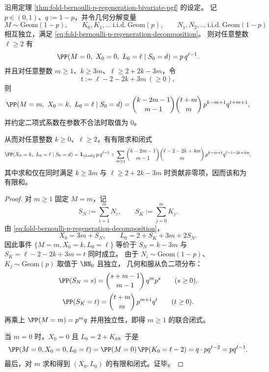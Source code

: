 \begin{theorem}\label{thm:fold-bernoulli-p-regeneration-triple-joint-law}
沿用定理 \ref{thm:fold-bernoulli-p-regeneration-bivariate-pgf} 的设定。
记 \(p\in(0,1)\)、\(q:=1-p\)，并令几何分解变量
\[
M\sim \mathrm{Geom}(1-p),\qquad
K_0,K_1,\dots\ \text{i.i.d.}\ \mathrm{Geom}(p),\qquad
N_1,N_2,\dots\ \text{i.i.d.}\ \mathrm{Geom}(1-p)
\]
相互独立，满足 \eqref{eq:fold-bernoulli-p-regeneration-decomposition}。
则对任意整数 \(\ell\ge 2\) 有
\[
\PP(M=0,\ X_0=0,\ L_0=\ell\mid S_0=d)
=p\,q^{\ell-1}.
\]
并且对任意整数 \(m\ge 1\)、\(k\ge 3m\)、\(\ell\ge 2+2k-3m\)，令
\[
t:=\ell-2-2k+3m\ (\ge 0),
\]
则
\[
\PP(M=m,\ X_0=k,\ L_0=\ell\mid S_0=d)
=\binom{k-2m-1}{m-1}\binom{t+m}{m}\,
p^{k-m+1}q^{t+m+1},
\]
并约定二项式系数在参数不合法时取值为 \(0\)。

从而对任意整数 \(k\ge 0\)、\(\ell\ge 2\)，有有限求和闭式
\[
\PP(X_0=k,\ L_0=\ell\mid S_0=d)
=\mathbf 1_{\{k=0\}}\,p\,q^{\ell-1}
+\sum_{m\ge 1}
\binom{k-2m-1}{m-1}\binom{\ell-2-2k+4m}{m}\,
p^{k-m+1}q^{\ell-1-2k+4m},
\]
其中求和仅在同时满足 \(k\ge 3m\) 与 \(\ell\ge 2+2k-3m\) 时贡献非零项，因而该和为有限和。
\end{theorem}
\begin{proof}
对 \(m\ge 1\) 固定 \(M=m\)，记
\[
S_N:=\sum_{i=1}^{m}N_i,\qquad S_K:=\sum_{j=0}^{m}K_j.
\]
由 \eqref{eq:fold-bernoulli-p-regeneration-decomposition}，
\[
X_0=3m+S_N,\qquad
L_0=2+S_K+3m+2S_N.
\]
因此事件 \(\{M=m,X_0=k,L_0=\ell\}\) 等价于
\(
S_N=k-3m
\) 与
\(
S_K=\ell-2-2k+3m=t
\) 同时成立。
由于 \(N_i\sim\mathrm{Geom}(1-p)\)、\(K_j\sim\mathrm{Geom}(p)\) 取值于 \(\NN_0\) 且独立，
几何和服从负二项分布：
\[
\PP(S_N=s)=\binom{s+m-1}{m-1}\,q^m p^{s}\qquad(s\ge 0),
\]
\[
\PP(S_K=t)=\binom{t+m}{m}\,p^{m+1} q^{t}\qquad(t\ge 0).
\]
再乘上
\(
\PP(M=m)=p^{m}q
\)
并用独立性，即得 \(m\ge 1\) 的联合闭式。

当 \(m=0\) 时，\(X_0=0\) 且 \(L_0=2+K_0\)。于是
\[
\PP(M=0,X_0=0,L_0=\ell)
=\PP(M=0)\,\PP(K_0=\ell-2)
=q\cdot p q^{\ell-2}
=p q^{\ell-1}.
\]
最后，对 \(m\) 求和得到 \((X_0,L_0)\) 的有限和闭式。证毕。
\end{proof}

